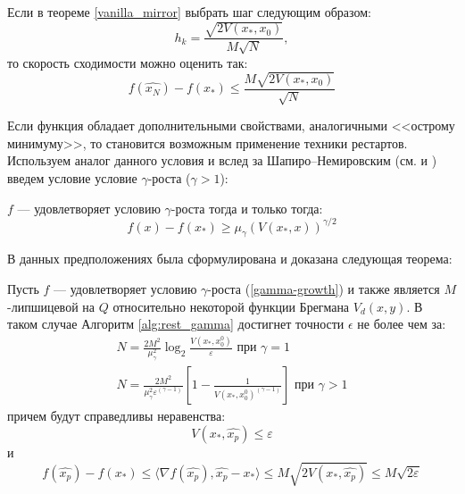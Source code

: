 \begin{remark}
    Если в теореме \ref{vanilla_mirror} выбрать шаг следующим образом:
    \begin{equation} \label{mirr_step}
        h_{k} = \frac{\sqrt{2 V(x_*, x_0)}}{M\sqrt{N}},
    \end{equation}
    то скорость сходимости можно оценить так:
    \begin{equation} \label{mirr_est}
        f(\widehat{x_N}) - f(x_*) \leq \frac{M\sqrt{2V(x_*, x_0)}}{\sqrt{N}}
    \end{equation}
\end{remark}
Если функция обладает дополнительными свойствами, аналогичными <<острому минимуму>>,  то становится возможным применение техники рестартов. Используем аналог данного условия и вслед за Шапиро–Немировским (см. \cite{shapiro_2005} и \cite{shapiro_2021} ) введем  условие условие $\gamma$-роста ($\gamma > 1$):
\begin{definition} \label{gamma-growth}
   $f$ --- удовлетворяет условию $\gamma$-роста тогда и только тогда:
   \begin{equation}
       f(x) - f(x_*) \geq \mu_{\gamma}(V(x_*,x))^{\gamma/2}
   \end{equation}
\end{definition}

В данных предположениях была сформулирована и доказана следующая теорема:
\begin{theorem} \label{simple_restart}
    Пусть $f$ --- удовлетворяет условию $\gamma$-роста (\ref{gamma-growth}) и также является $M$-липшицевой на $Q$ относительно некоторой функции Брегмана $V_d(x, y)$. В таком случае Алгоритм \ref{alg:rest_gamma} достигнет точности $\epsilon$ не более чем за:
    \begin{equation}
    \begin{aligned}
       N =\frac{2 M^2}{\mu_{\gamma}^2} \log_2{\frac{V(x_*, x_0^0)}{\varepsilon}} \text{ при } \gamma = 1 \\
       N = \frac{2 M^2}{\mu_{\gamma}^2 \varepsilon^{(\gamma-1)} } \left[1 - \frac{1} {V(x_*, x_0^0)^{(\gamma - 1)}}\right] \text{ при } \gamma > 1
    \end{aligned}
    \end{equation}
    причем будут справедливы неравенства:
    \begin{equation}
       V(x_*, \widehat{x_p}) \leq \varepsilon
    \end{equation}
    и
    \begin{equation}
        f(\widehat{x_p}) - f(x_*) \leq  \langle \nabla f(\widehat{x_p}), \widehat{x_p} - x_* \rangle \leq M \sqrt{ 2 V(x_*, \widehat{x_p})} \leq M \sqrt{2 \varepsilon}  
    \end{equation}
\end{theorem}

